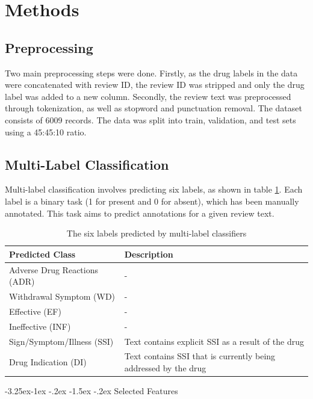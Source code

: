 \documentclass[10.7pt, onecolumn]{article}
\makeatletter
\renewcommand\subsubsection{\@startsection{subsubsection}{3}{\z@}%
	{-3.25ex\@plus -1ex \@minus -.2ex}%
    {-1.5ex \@plus -.2ex}%
    {\normalfont\itshape}}
\makeatother
\begin{document}
\section{Methods}\label{methods}
\subsection{Preprocessing}
Two main preprocessing steps were done. Firstly, as the drug labels in the data were concatenated with review ID, the review ID was stripped and only the drug label was added to a new column. Secondly, the review text was preprocessed through tokenization, as well as stopword and punctuation removal. The dataset consists of 6009 records. The data was split into train, validation, and test sets using a 45:45:10 ratio.
\subsection{Multi-Label Classification}
Multi-label classification involves predicting six labels, as shown in table \ref{tab:6Labels}. Each label is a binary task (1 for present and 0 for absent), which has been manually annotated. This task aims to predict annotations for a given review text.

\begin{table}[H]
  \centering
  \begin{tabular}{|p{4cm}|p{3cm}|}
    \hline
    \textbf{Predicted Class} & \textbf{Description} \\
    \hline
    Adverse Drug Reactions (ADR) & - \\
    \hline
    Withdrawal Symptom (WD) & - \\
    \hline
    Effective (EF) & - \\
    \hline
    Ineffective (INF) & - \\
    \hline
    Sign/Symptom/Illness (SSI) & Text contains explicit SSI as a result of the drug \\
    \hline
    Drug Indication (DI) & Text contains SSI that is currently being addressed by the drug \\
    \hline
  \end{tabular}
  \caption{The six labels predicted by multi-label classifiers}
  \label{tab:6Labels}
\end{table}

\subsubsection{Selected Features}
\end{document}
